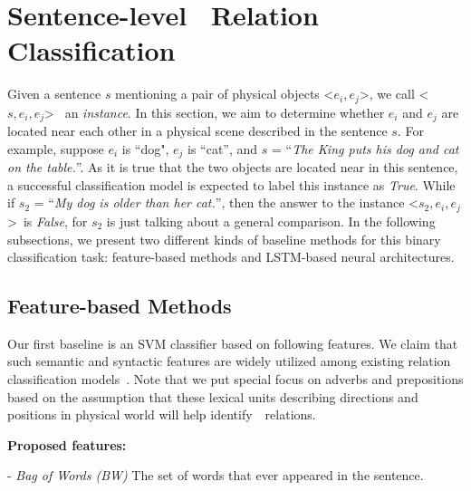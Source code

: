%
\section{Sentence-level \lnear~Relation Classification}
\label{sec:classify} 
Given a sentence $s$ mentioning a pair of physical objects 
\textless$e_i,e_j$\textgreater, we call \textless$s,e_i,e_j$\textgreater
~an {\em instance}. 
In this section, we aim to 
determine whether $e_i$ and $e_j$ are located near each other in a physical scene described in the sentence $s$.
For example, suppose $e_i$ is ``dog", $e_j$ is ``cat'', and $s$ = ``\textit{The King puts his dog and cat on the table.}''.
As it is true that the two objects are located near in this sentence, a successful classification model is expected to label this instance as \textit{True}.
While if $s_2$ = ``\textit{My dog is older than her cat.}'', then the answer to the instance \textless$s_2,e_i,e_j$\textgreater ~is \textit{False}, for $s_2$ is just talking about a general comparison.
In the following subsections, we present two different kinds of baseline methods for this binary classification task: feature-based methods and  LSTM-based neural architectures.

\subsection{Feature-based Methods}
\label{sec:feature}
Our first baseline is an SVM classifier based on following features. 
We claim that such semantic and syntactic features are widely utilized among existing relation classification models~\cite{Bunescu2005ASP,sem,Zhou2005ExploringVK,Ren2017CoTypeJE}. Note that we put special focus on adverbs and prepositions based on the assumption that these lexical units describing directions and positions in physical world will help identify~\lnear~relations.

\noindent
\textbf{Proposed features:}

- \textit{Bag of Words (BW)}
The set of words that ever appeared in the sentence. 

